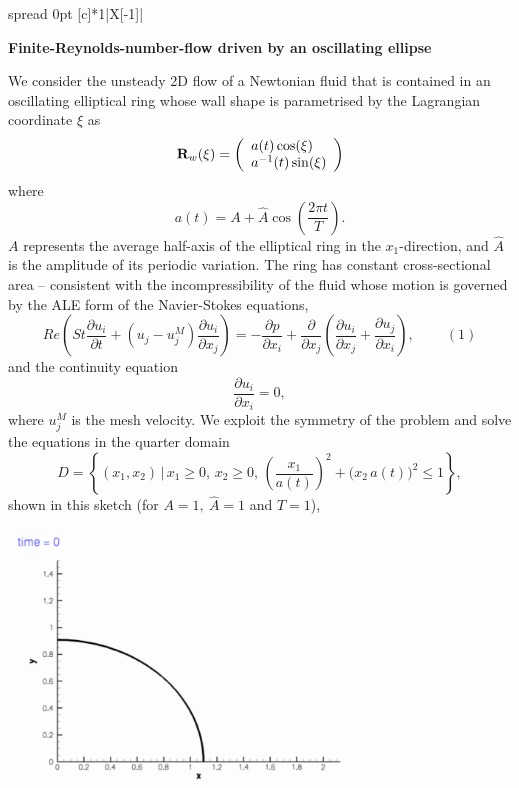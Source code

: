 \begin{center} \tabulinesep=1mm
\begin{longtabu} spread 0pt [c]{*{1}{|X[-1]}|}
\hline
\begin{center} {\bfseries Finite-\/\+Reynolds-\/number-\/flow driven by an oscillating ellipse} \end{center} 

We consider the unsteady 2D flow of a Newtonian fluid that is contained in an oscillating elliptical ring whose wall shape is parametrised by the Lagrangian coordinate $ \xi $ as \[ {\bf R}_w(\xi) = \left( \begin{array}{l} a(t) \cos(\xi) \\ a^{-1}(t) \sin(\xi) \end{array} \right) \] where \[ a(t) = A + \widehat{A} \cos\left(\frac{2\pi t}{T}\right). \] $ A $ represents the average half-\/axis of the elliptical ring in the $ x_1 $-\/direction, and $ \widehat{A} $ is the amplitude of its periodic variation. The ring has constant cross-\/sectional area -- consistent with the incompressibility of the fluid whose motion is governed by the A\+LE form of the Navier-\/\+Stokes equations, \[ Re\left(St\frac{\partial u_i}{\partial t} + \left(u_j-u_j^M\right)\frac{\partial u_i}{\partial x_j}\right) = - \frac{\partial p}{\partial x_i} + \frac{\partial }{\partial x_j} \left( \frac{\partial u_i}{\partial x_j} + \frac{\partial u_j}{\partial x_i} \right), \ \ \ \ \ \ \ \ \ \ (1) \] and the continuity equation \[ \frac{\partial u_i}{\partial x_i} = 0, \] where $ u_j^M $ is the mesh velocity. We exploit the symmetry of the problem and solve the equations in the quarter domain \[ D = \left\{(x_1,x_2) \, \bigg| \, x_1\geq0, \, x_2\geq0,\, \left(\frac{x_1}{a(t)}\right)^2 + \big(x_2 \, a(t)\big)^2 \leq 1\right\}, \] shown in this sketch (for $ A=1, \ \widehat{A}=1 $ and $T=1$),  
\begin{DoxyImage}
\includegraphics[width=0.75\textwidth]{wall}
\end{DoxyImage}



\end{longtabu}
\end{center}
